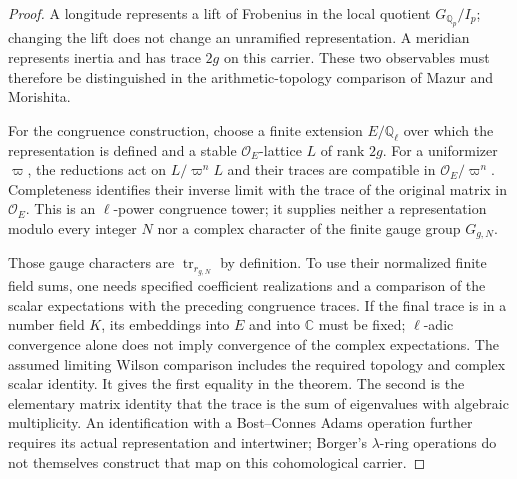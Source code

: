 \begin{proof}
A longitude represents a lift of Frobenius in the local quotient
$G_{\mathbb Q_p}/I_p$; changing the lift does not change an unramified
representation. A meridian represents inertia and has trace $2g$
on this carrier. These two observables must therefore be distinguished
in the arithmetic-topology comparison of Mazur and Morishita.

For the congruence construction, choose a finite extension
$E/\mathbb Q_\ell$ over which the representation is defined and a
stable $\mathcal O_E$-lattice $L$ of rank $2g$. For a uniformizer
$\varpi$, the reductions act on $L/\varpi^nL$ and their traces are
compatible in $\mathcal O_E/\varpi^n$. Completeness identifies their
inverse limit with the trace of the original matrix in $\mathcal O_E$.
This is an $\ell$-power congruence tower; it supplies neither a
representation modulo every integer $N$ nor a complex character
of the finite gauge group $G_{g,N}$.

Those gauge characters are $\operatorname{tr}_{r_{g,N}}$ by
definition. To use their normalized finite field sums, one needs
specified coefficient realizations and a comparison of the scalar
expectations with the preceding congruence traces. If the final
trace is in a number field $K$, its embeddings into $E$ and into
$\mathbb C$ must be fixed; $\ell$-adic convergence alone does not
imply convergence of the complex expectations. The assumed limiting
Wilson comparison includes the required topology and complex scalar
identity. It gives the first equality in the theorem.
The second is the elementary matrix identity that the trace is the
sum of eigenvalues with algebraic multiplicity. An identification
with a Bost--Connes Adams operation further requires its actual
representation and intertwiner; Borger's $\lambda$-ring operations
do not themselves construct that map on this cohomological carrier.
\end{proof}

